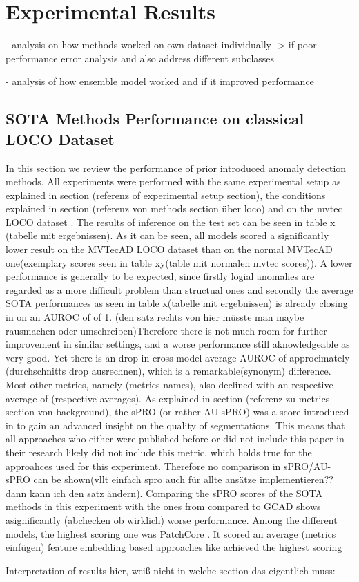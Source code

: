 \chapter{Experimental Results}
\label{chap:experiments}



- analysis on how methods worked on own dataset individually
-> if poor performance error analysis and also address different subclasses

- analysis of how ensemble model worked and if it improved performance



\section{SOTA Methods Performance on classical LOCO Dataset}
In this section we review the performance of prior introduced anomaly detection methods. All experiments were performed with the same 
experimental setup as explained in section (referenz of experimental setup section), the conditions explained in section (referenz von methods section über loco) 
and on the mvtec LOCO dataset \cite{LOCODentsAndScratchesBergmann2022}. 
The results of inference on the test set can be seen in table x (tabelle mit ergebnissen). As it can be seen, all models scored a significantly 
lower result on the MVTecAD LOCO dataset than on the normal MVTecAD one(exemplary scores seen in table xy(table mit normalen mvtec scores)). 
A lower performance is generally to be expected, since firstly logial anomalies are regarded as a more difficult problem than structual 
ones and secondly the average SOTA performances as seen in table x(tabelle mit ergebnissen) is already closing in on an AUROC of of 1. 
(den satz rechts von hier müsste man maybe rausmachen oder umschreiben)Therefore there is not much room for further improvement in similar settings, and a worse performance still aknowledgeable as very good. 
Yet there is an drop in cross-model average AUROC of approcimately (durchschnitts drop ausrechnen), which is a remarkable(synonym) difference. 
Most other metrics, namely (metrics names), also declined with an respective average of (respective averages). As explained in section 
(referenz zu metrics section von background), the sPRO (or rather AU-sPRO) was a score introduced in \cite{LOCODentsAndScratchesBergmann2022} to gain an 
advanced insight on the quality of segmentations. This means that all approaches who either were published before or did not include this 
paper in their research likely did not include this metric, which holds true for the approahces used for this experiment. Therefore no comparison 
in sPRO/AU-sPRO can be shown(vllt einfach spro auch für allte ansätze implementieren?? dann kann ich den satz ändern). Comparing the sPRO 
scores of the SOTA methods in this experiment with the ones from compared to GCAD \cite{LOCODentsAndScratchesBergmann2022} shows asignificantly 
(abchecken ob wirklich) worse performance.
Among the different models, the highest scoring one was PatchCore \cite{patchCore2022}. It scored an average (metrics einfügen) feature embedding based approaches like  
achieved the highest scoring

Interpretation of results hier, weiß nicht in welche section das eigentlich muss:









